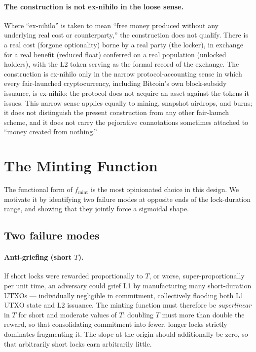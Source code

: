 \documentclass[11pt,a4paper]{article}
\newcommand{\fmint}{f_{\mathrm{mint}}}
\begin{document}
\paragraph{The construction is not ex-nihilo in the loose sense.} Where ``ex-nihilo'' is taken to mean ``free money produced without any underlying real cost or counterparty,'' the construction does not qualify. There is a real cost (forgone optionality) borne by a real party (the locker), in exchange for a real benefit (reduced float) conferred on a real population (unlocked holders), with the L2 token serving as the formal record of the exchange. The construction is ex-nihilo only in the narrow protocol-accounting sense in which every fair-launched cryptocurrency, including Bitcoin's own block-subsidy issuance, is ex-nihilo: the protocol does not acquire an asset against the tokens it issues. This narrow sense applies equally to mining, snapshot airdrops, and burns; it does not distinguish the present construction from any other fair-launch scheme, and it does not carry the pejorative connotations sometimes attached to ``money created from nothing.''

\section{The Minting Function}
\label{sec:fn}

The functional form of $\fmint$ is the most opinionated choice in this design. We motivate it by identifying two failure modes at opposite ends of the lock-duration range, and showing that they jointly force a sigmoidal shape.

\subsection{Two failure modes}

\paragraph{Anti-griefing (short $T$).} If short locks were rewarded proportionally to $T$, or worse, super-proportionally per unit time, an adversary could grief L1 by manufacturing many short-duration UTXOs --- individually negligible in commitment, collectively flooding both L1 UTXO state and L2 issuance. The minting function must therefore be \emph{superlinear} in $T$ for short and moderate values of $T$: doubling $T$ must more than double the reward, so that consolidating commitment into fewer, longer locks strictly dominates fragmenting it. The slope at the origin should additionally be zero, so that arbitrarily short locks earn arbitrarily little.
\end{document}

